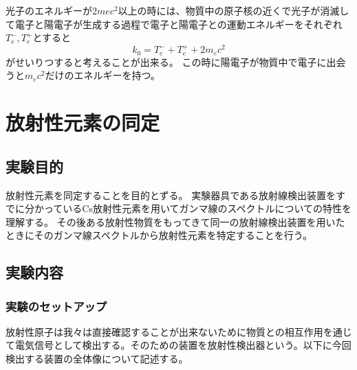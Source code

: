 \documentclass[titlepage]{ltjsarticle}
\begin{document}
光子のエネルギーが\(2mec^2\)以上の時には、物質中の原子核の近くで光子が消滅して電子と陽電子が生成する過程で電子と陽電子との運動エネルギーをそれぞれ\(T^-_e,T^+_e\)とすると
\begin{equation}
  k_0 = T^-_e + T^+_e + 2m_e c^2
\end{equation}
がせいりつすると考えることが出来る。
この時に陽電子が物質中で電子に出会うと\(m_ec^2\)だけのエネルギーを持つ。


\section{放射性元素の同定}

\subsection{実験目的}

放射性元素を同定することを目的とずる。
実験器具である放射線検出装置をすでに分かっているCs放射性元素を用いてガンマ線のスペクトルについての特性を理解する。
その後ある放射性物質をもってきて同一の放射線検出装置を用いたときにそのガンマ線スペクトルから放射性元素を特定することを行う。


\subsection{実験内容}
\subsubsection{実験のセットアップ}

放射性原子は我々は直接確認することが出来ないために物質との相互作用を通じて電気信号として検出する。そのための装置を放射性検出器という。以下に今回検出する装置の全体像について記述する。
\end{document}
